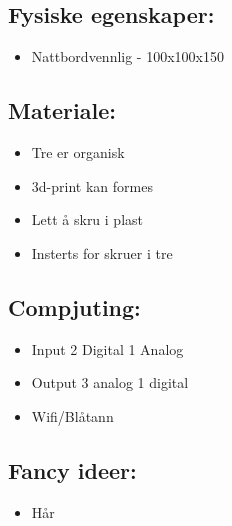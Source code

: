 \documentclass[12pt, a4paper]{article}
\begin{document}
\subsection {Fysiske egenskaper: }
\begin{itemize}
    \item Nattbordvennlig - 100x100x150
\end{itemize}


\subsection {Materiale:}
\begin{itemize}
    \item Tre er organisk
    \item 3d-print kan formes
    \item Lett å skru i plast
    \item Insterts for skruer i tre
\end{itemize}

\subsection {Compjuting:}
\begin{itemize}
    \item Input
2 Digital
1 Analog
    \item Output
3 analog
1 digital
    \item Wifi/Blåtann
\end{itemize}


\subsection {Fancy ideer: }
\begin{itemize}
    \item Hår
\end{itemize}
\end{document}
